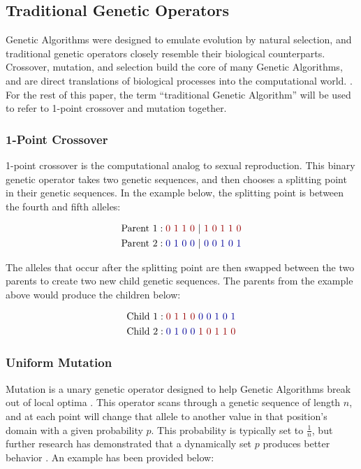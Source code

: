 \subsection*{Traditional Genetic Operators}
Genetic Algorithms were designed to emulate evolution by natural selection, and traditional genetic operators closely resemble their biological counterparts. Crossover, mutation, and selection build the core of many Genetic Algorithms, and are direct translations of biological processes into the computational world. \cite{Russell10}. For the rest of this paper, the term ``traditional Genetic Algorithm'' will be used to refer to 1-point crossover and mutation together.

\subsubsection*{1-Point Crossover}
1-point crossover is the computational analog to sexual reproduction. This binary genetic operator takes two genetic sequences, and then chooses a splitting point in their genetic sequences. In the example below, the splitting point is between the fourth and fifth alleles:

\begin{align*}
\text{Parent 1} &: {\color{myred}0~1~1~0~}|{\color{myred}~1~0~1~1~0} 			\\
\text{Parent 2} &: {\color{myblue}0~1~0~0~}|{\color{myblue}~0~0~1~0~1} 	\\		
\end{align*}

\noindent The alleles that occur after the splitting point are then swapped between the two parents to create two new child genetic sequences. The parents from the example above would produce the children below:

\begin{align*}
\text{Child 1} &: {\color{myred}0~1~1~0}{\color{myblue}~0~0~1~0~1} 			\\  
\text{Child 2} &: {\color{myblue}0~1~0~0}{\color{myred}~1~0~1~1~0} 		
\end{align*}

\subsubsection*{Uniform Mutation}
Mutation is a unary genetic operator designed to help Genetic Algorithms break out of local optima \cite{Russell10}. This operator scans through a genetic sequence of length $n$, and at each point will change that allele to another value in that position's domain with a given probability $p$. This probability is typically set to $\frac{1}{n}$, but further research has demonstrated that a dynamically set $p$ produces better behavior \cite{Back93}. An example has been provided below:

